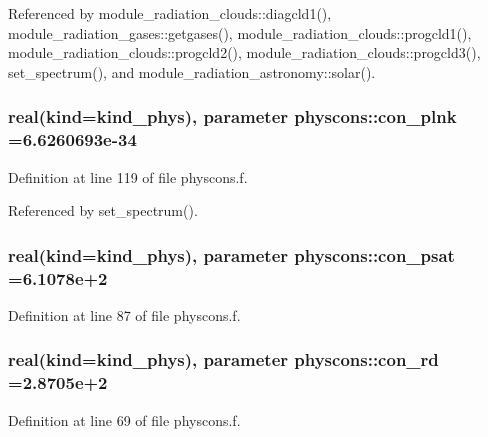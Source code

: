 Referenced by module\+\_\+radiation\+\_\+clouds\+::diagcld1(), module\+\_\+radiation\+\_\+gases\+::getgases(), module\+\_\+radiation\+\_\+clouds\+::progcld1(), module\+\_\+radiation\+\_\+clouds\+::progcld2(), module\+\_\+radiation\+\_\+clouds\+::progcld3(), set\+\_\+spectrum(), and module\+\_\+radiation\+\_\+astronomy\+::solar().

\subsubsection[{\texorpdfstring{con\+\_\+plnk}{con_plnk}}]{\setlength{\rightskip}{0pt plus 5cm}real(kind=kind\+\_\+phys), parameter physcons\+::con\+\_\+plnk =6.\+6260693e-\/34}\hypertarget{namespacephyscons_ac94d6814305be7f718a971f96ccb9f3f}{}\label{namespacephyscons_ac94d6814305be7f718a971f96ccb9f3f}


Definition at line 119 of file physcons.\+f.



Referenced by set\+\_\+spectrum().

\subsubsection[{\texorpdfstring{con\+\_\+psat}{con_psat}}]{\setlength{\rightskip}{0pt plus 5cm}real(kind=kind\+\_\+phys), parameter physcons\+::con\+\_\+psat =6.\+1078e+2}\hypertarget{namespacephyscons_a86f12d814a25d633cd0c05b90cd84ec8}{}\label{namespacephyscons_a86f12d814a25d633cd0c05b90cd84ec8}


Definition at line 87 of file physcons.\+f.

\subsubsection[{\texorpdfstring{con\+\_\+rd}{con_rd}}]{\setlength{\rightskip}{0pt plus 5cm}real(kind=kind\+\_\+phys), parameter physcons\+::con\+\_\+rd =2.\+8705e+2}\hypertarget{namespacephyscons_ac7dc37b0005878c5fd2f200720ffb059}{}\label{namespacephyscons_ac7dc37b0005878c5fd2f200720ffb059}


Definition at line 69 of file physcons.\+f.



